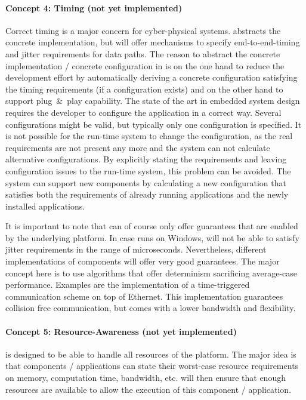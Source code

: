 \paragraph{Concept 4: Timing (not yet implemented)}
Correct timing is a major concern for cyber-physical systems. \xme abstracts the concrete implementation, but will offer mechanisms to
specify end-to-end-timing and jitter requirements for data paths.
The reason to abstract the concrete implementation / concrete configuration
in \xme is on the one hand to reduce the development effort by automatically deriving a concrete configuration satisfying the timing
requirements (if a configuration exists) and on the other hand to support plug~\&~play capability. The state of the art in embedded system
design requires the developer to configure the application in a correct way. Several configurations might be valid, but typically only one
configuration is specified. It is not possible for the run-time system to change the configuration, as the real requirements are not present
any more and the system can not calculate alternative configurations. By explicitly stating the requirements and leaving configuration issues
to the run-time system, this problem can be avoided.
The system can support new components by calculating a new configuration that satisfies both
the requirements of already running applications and the newly installed applications.

It is important to note that \xme can of course only offer guarantees that are enabled by the underlying platform.
In case \xme runs on Windows, \xme will not be able to satisfy jitter requirements in the range of microseconds.
Nevertheless, different implementations of components will offer very good guarantees.
The major concept here is to use algorithms that offer determinism sacrificing average-case performance.
Examples are the implementation of a time-triggered communication scheme on top of Ethernet.
This implementation guarantees collision free communication, but comes with a lower bandwidth and flexibility.

\paragraph{Concept 5: Resource-Awareness (not yet implemented)}
\xme is designed to be able to handle all resources of the platform.
The major idea is that components / applications can state their worst-case resource requirements
on memory, computation time, bandwidth, etc.
\xme will then ensure that enough resources are available to allow the execution of this component / application.


